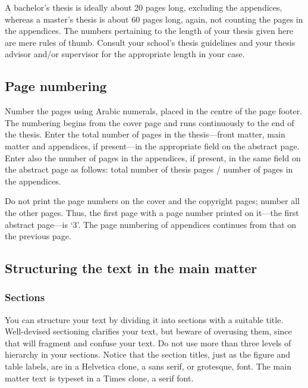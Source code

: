 \documentclass[english, 12pt, a4paper, sci, utf8, a-2b, online]{aaltothesis}
\begin{document}
A bachelor’s thesis is ideally about 20 pages long, excluding the appendices, 
whereas a master’s thesis is about 60 pages long, again, not counting the pages
in the appendices. The numbers pertaining to the length of your thesis given
here are mere rules of thumb. Consult your school’s thesis guidelines and your 
thesis advisor and/or supervisor for the appropriate length in your case.


\subsection{Page numbering}
Number the pages using Arabic numerals, placed in the centre of the page footer.
The numbering begins from the cover page and runs continuously to the end of the 
thesis. Enter the total number of pages in the thesis---front matter, main
matter and appendices, if present---in the appropriate field on the abstract
page. Enter also the number of pages in the appendices, if present, in the same 
field on the abstract page as follows: total number of thesis pages / number of 
pages in the appendices.

Do not print the page numbers on the cover and the copyright pages; number all
the other pages. Thus, the first page with a page number printed on it---the
first abstract page---is ‘3’. The page numbering of appendices continues from
that on the previous page.


\subsection{Structuring the text in the main matter}
\subsubsection{Sections}

You can structure your text by dividing it into sections with a suitable title. 
Well-devised sectioning clarifies your text, but beware of overusing them, since 
that will fragment and confuse your text. Do not use more than three levels of 
hierarchy in your sections. Notice that the section titles, just as the figure
and table labels, are in a Helvetica clone, a sans serif, or grotesque, font. 
The main matter text is typeset in a Times clone, a serif font.
\end{document}
